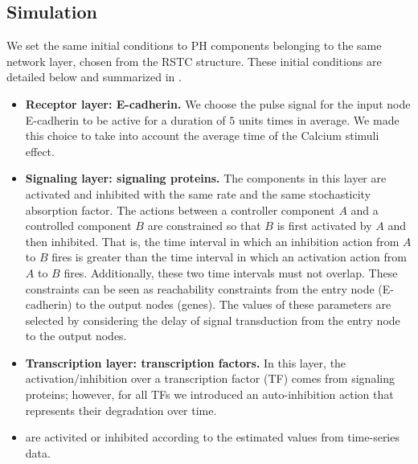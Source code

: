 \subsection{Simulation}

We set the same initial conditions to PH components belonging to the same network layer, chosen from the RSTC structure.
These initial conditions are detailed below and summarized in .

\begin{itemize}
 \item \textbf{Receptor layer: E-cadherin.} We choose the  pulse signal for the input node E-cadherin to be active for a duration of $5$ units times in average. We made this 
 choice to take into account the average time of the Calcium stimuli effect.
 \item \textbf{Signaling layer: signaling proteins.} The components in this layer are activated and inhibited with the same rate and the same stochasticity absorption factor. 
The actions between a controller component $A$ and a controlled component $B$ are constrained so that 
$B$ is first activated by $A$ and then inhibited.  That is, 
the time interval in which an inhibition action from $A$ to $B$ fires is greater than 
the time interval in which an activation action from $A$ to $B$ fires.
Additionally, these two time intervals must not overlap.
These constraints can be seen as 
reachability constraints from the entry  node (E-cadherin) to the output nodes (genes). The values of these parameters are selected by considering the delay of signal transduction from the entry
 node to the output nodes.
 \item \textbf{Transcription layer: transcription factors.} In this layer, the activation/inhibition over a transcription factor (TF) comes from signaling proteins; however, 
for all TFs we introduced an auto-inhibition action that represents their degradation over time. 
 \item {} are activited or inhibited according to the estimated values from time-series data.
\end{itemize}


